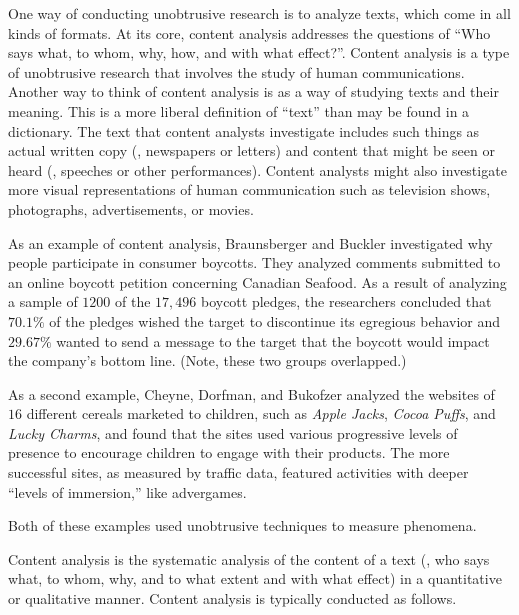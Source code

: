 One way of conducting unobtrusive research is to analyze texts, which come in all kinds of formats. At its core, content analysis addresses the questions of ``Who says what, to whom, why, how, and with what effect?''\cite{babbie2010practice}. Content analysis is a type of unobtrusive research that involves the study of human communications. Another way to think of content analysis is as a way of studying texts and their meaning. This is a more liberal definition of ``text'' than may be found in a dictionary. The text that content analysts investigate includes such things as actual written copy (\eg, newspapers or letters) and content that might be seen or heard (\eg, speeches or other performances). Content analysts might also investigate more visual representations of human communication such as television shows, photographs, advertisements, or movies.

As an example of content analysis, Braunsberger and Buckler \cite{braunsberger2011motivates} investigated why people participate in consumer boycotts. They analyzed comments submitted to an online boycott petition concerning Canadian Seafood. As a result of analyzing a sample of $ 1200 $ of the $ 17,496 $ boycott pledges, the researchers concluded that $ 70.1\% $ of the pledges wished the target to discontinue its egregious behavior and $ 29.67\% $ wanted to send a message to the target that the boycott would impact the company's bottom line. (Note, these two groups overlapped.) 

As a second example, Cheyne, Dorfman, and Bukofzer \cite{cheyne2013marketing} analyzed the websites of $ 16 $ different cereals marketed to children, such as \textit{Apple Jacks}, \textit{Cocoa Puffs}, and \textit{Lucky Charms}, and found that the sites used various progressive levels of presence to encourage children to engage with their products. The more successful sites, as measured by traffic data, featured activities with deeper ``levels of immersion,'' like advergames.

Both of these examples used unobtrusive techniques to measure phenomena. 

Content analysis is the systematic analysis of the content of a text (\eg, who says what, to whom, why, and to what extent and with what effect) in a quantitative or qualitative manner. Content analysis is typically conducted as follows. 

